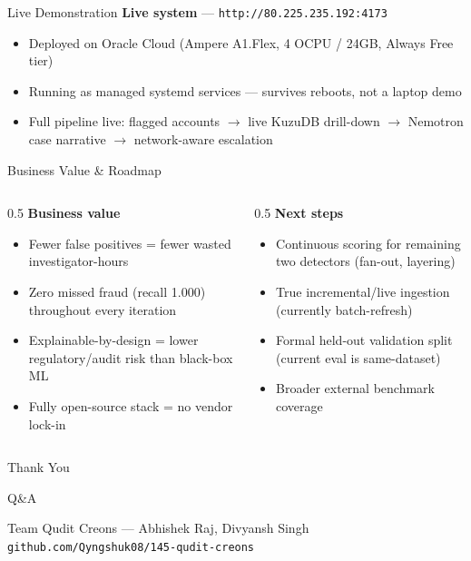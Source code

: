 \documentclass[aspectratio=169]{beamer}
\begin{document}
\begin{frame}{Live Demonstration}
\centering
\Large \textbf{Live system} --- \texttt{http://80.225.235.192:4173}

\vspace{1em}
\normalsize
\begin{itemize}
\item Deployed on Oracle Cloud (Ampere A1.Flex, 4 OCPU / 24GB, Always Free tier)
\item Running as managed systemd services --- survives reboots, not a laptop demo
\item Full pipeline live: flagged accounts $\rightarrow$ live KuzuDB drill-down $\rightarrow$ Nemotron case narrative $\rightarrow$ network-aware escalation
\end{itemize}
\end{frame}

\begin{frame}{Business Value \& Roadmap}
\small
\begin{columns}[T]
\begin{column}{0.5\textwidth}
\textbf{Business value}
\begin{itemize}
\item Fewer false positives = fewer wasted investigator-hours
\item Zero missed fraud (recall 1.000) throughout every iteration
\item Explainable-by-design = lower regulatory/audit risk than black-box ML
\item Fully open-source stack = no vendor lock-in
\end{itemize}
\end{column}
\begin{column}{0.5\textwidth}
\textbf{Next steps}
\begin{itemize}
\item Continuous scoring for remaining two detectors (fan-out, layering)
\item True incremental/live ingestion (currently batch-refresh)
\item Formal held-out validation split (current eval is same-dataset)
\item Broader external benchmark coverage
\end{itemize}
\end{column}
\end{columns}
\end{frame}

\begin{frame}
\centering
\Huge Thank You

\vspace{1em}
\Large Q\&A

\vspace{2em}
\normalsize Team Qudit Creons --- Abhishek Raj, Divyansh Singh \\
\texttt{github.com/Qyngshuk08/145-qudit-creons}
\end{frame}
\end{document}
